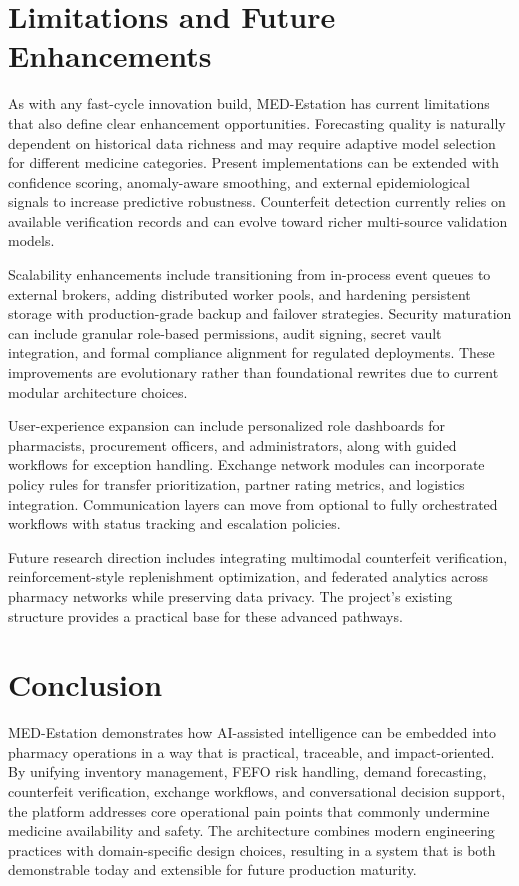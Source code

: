\documentclass[12pt,a4paper]{report}
\begin{document}
\chapter{Limitations and Future Enhancements}
As with any fast-cycle innovation build, MED-Estation has current limitations that also define clear enhancement opportunities. Forecasting quality is naturally dependent on historical data richness and may require adaptive model selection for different medicine categories. Present implementations can be extended with confidence scoring, anomaly-aware smoothing, and external epidemiological signals to increase predictive robustness. Counterfeit detection currently relies on available verification records and can evolve toward richer multi-source validation models.

Scalability enhancements include transitioning from in-process event queues to external brokers, adding distributed worker pools, and hardening persistent storage with production-grade backup and failover strategies. Security maturation can include granular role-based permissions, audit signing, secret vault integration, and formal compliance alignment for regulated deployments. These improvements are evolutionary rather than foundational rewrites due to current modular architecture choices.

User-experience expansion can include personalized role dashboards for pharmacists, procurement officers, and administrators, along with guided workflows for exception handling. Exchange network modules can incorporate policy rules for transfer prioritization, partner rating metrics, and logistics integration. Communication layers can move from optional to fully orchestrated workflows with status tracking and escalation policies.

Future research direction includes integrating multimodal counterfeit verification, reinforcement-style replenishment optimization, and federated analytics across pharmacy networks while preserving data privacy. The project’s existing structure provides a practical base for these advanced pathways.

\chapter{Conclusion}
MED-Estation demonstrates how AI-assisted intelligence can be embedded into pharmacy operations in a way that is practical, traceable, and impact-oriented. By unifying inventory management, FEFO risk handling, demand forecasting, counterfeit verification, exchange workflows, and conversational decision support, the platform addresses core operational pain points that commonly undermine medicine availability and safety. The architecture combines modern engineering practices with domain-specific design choices, resulting in a system that is both demonstrable today and extensible for future production maturity.
\end{document}
